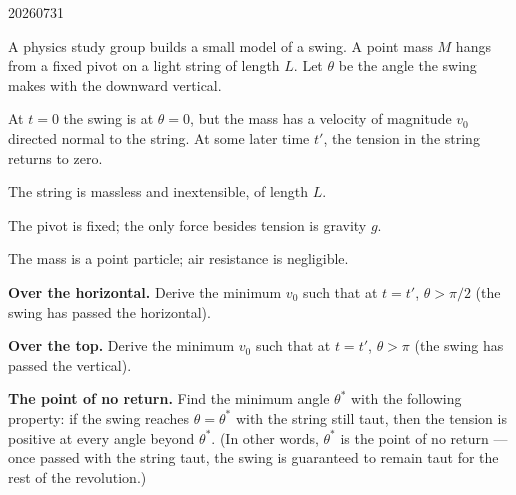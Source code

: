 

\begin{problem}{20260731}

A physics study group builds a small model of a swing.  A point mass $M$ hangs from a fixed pivot on a light string of length $L$.  Let $\theta$ be the angle the swing makes with the downward vertical.

At $t = 0$ the swing is at $\theta = 0$, but the mass has a velocity of magnitude $v_0$ directed normal to the string.  At some later time $t'$, the tension in the string returns to zero.

\begin{assumptions}
  \item The string is massless and inextensible, of length $L$.
  \item The pivot is fixed; the only force besides tension is gravity $g$.
  \item The mass is a point particle; air resistance is negligible.
\end{assumptions}

\begin{questions}
  \item \textbf{Over the horizontal.}
        Derive the minimum $v_0$ such that at $t = t'$, $\theta > \pi/2$ (the swing has passed the horizontal).

  \item \textbf{Over the top.}
        Derive the minimum $v_0$ such that at $t = t'$, $\theta > \pi$ (the swing has passed the vertical).

  \item \textbf{The point of no return.}
        Find the minimum angle $\theta^{*}$ with the following property: if the swing reaches $\theta = \theta^{*}$ with the string still taut, then the tension is positive at every angle beyond $\theta^{*}$.  (In other words, $\theta^{*}$ is the point of no return — once passed with the string taut, the swing is guaranteed to remain taut for the rest of the revolution.)
\end{questions}

\end{problem}

